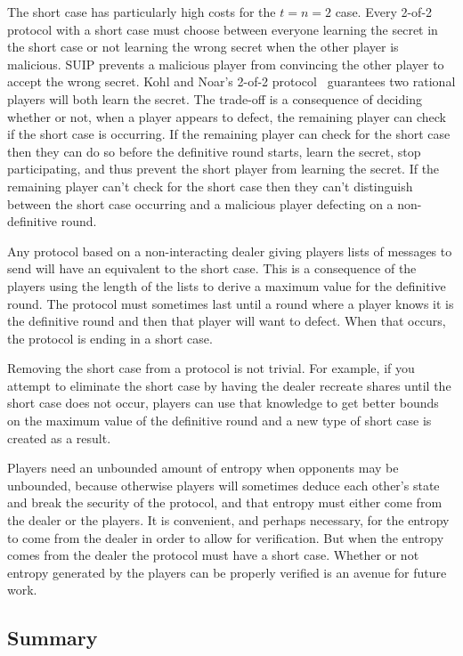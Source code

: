 \documentclass[12pt]{dalcsthesis}
\begin{document}
The short case has particularly high costs for the $t=n=2$ case. Every 2-of-2 protocol with a short case must choose between everyone learning the secret in the short case or not learning the wrong secret when the other player is malicious. SUIP prevents a malicious player from convincing the other player to accept the wrong secret. Kohl and Noar's 2-of-2 protocol~\cite{kol08} guarantees two rational players will both learn the secret. The trade-off is a consequence of deciding whether or not, when a player appears to defect, the remaining player can check if the short case is occurring. If the remaining player can check for the short case then they can do so before the definitive round starts, learn the secret, stop participating, and thus prevent the short player from learning the secret. If the remaining player can't check for the short case then they can't distinguish between the short case occurring and a malicious player defecting on a non-definitive round.

Any protocol based on a non-interacting dealer giving players lists of messages to send will have an equivalent to the short case. This is a consequence of the players using the length of the lists to derive a maximum value for the definitive round. The protocol must sometimes last until a round where a player knows it is the definitive round and then that player will want to defect. When that occurs, the protocol is ending in a short case.

Removing the short case from a protocol is not trivial. For example, if you attempt to eliminate the short case by having the dealer recreate shares until the short case does not occur, players can use that knowledge to get better bounds on the maximum value of the definitive round and a new type of short case is created as a result.

Players need an unbounded amount of entropy when opponents may be unbounded, because otherwise players will sometimes deduce each other's state and break the security of the protocol, and that entropy must either come from the dealer or the players. It is convenient, and perhaps necessary, for the entropy to come from the dealer in order to allow for verification. But when the entropy comes from the dealer the protocol must have a short case. Whether or not entropy generated by the players can be properly verified is an avenue for future work.


\subsection{Summary}
\end{document}
